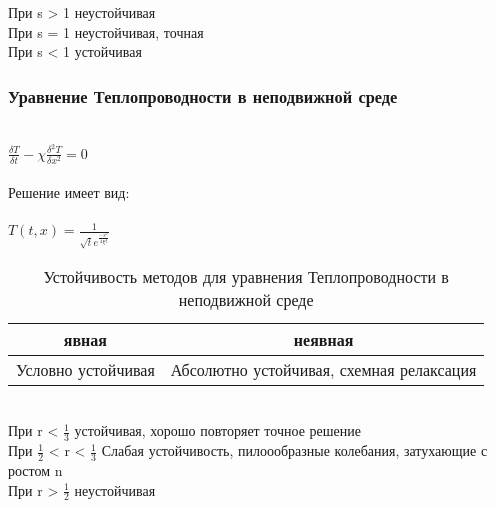 \documentclass{article}
\begin{document}
При s > 1 неустойчивая\\

При s = 1 неустойчивая, точная\\

При s < 1 устойчивая\\

\subsubsection{Уравнение Теплопроводности в неподвижной среде}\\

$\frac{\delta T}{\delta t} - \chi \frac{\delta^{2} T}{\delta x^{2}} = 0$\\\\

Решение имеет вид: \\\\

$T(t, x) = \frac{1}{\sqrt{t}e^{\frac{-x^{2}}{4\chi t}}}$

\begin{table}[h!]
    \centering
    \begin{tabular}{|c|c|}
        \hline
          явная & неявная \\
         \hline
         Условно устойчивая& Абсолютно устойчивая, схемная релаксация\\
         \hline
    \end{tabular}
    \caption{Устойчивость методов для уравнения Теплопроводности в неподвижной среде}
    \label{tab:my_label}
\end{table}\\


При r < $\frac{1}{3}$ устойчивая, хорошо повторяет точное решение\\

При $\frac{1}{2}$ < r < $\frac{1}{3}$ Слабая устойчивость, пилоообразные колебания, затухающие с ростом n\\

При r > $\frac{1}{2}$ неустойчивая\\
\end{document}
